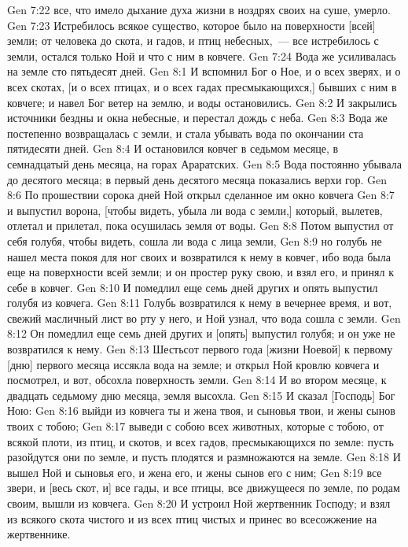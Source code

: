 \vs Gen 7:22 все, что имело дыхание духа жизни в ноздрях своих на суше, умерло.
\vs Gen 7:23 Истребилось всякое существо, которое было на поверхности [всей] земли; от человека до скота, и гадов, и птиц небесных,~--- все истребилось с земли, остался только Ной и что  с ним в ковчеге.
\vs Gen 7:24 Вода же усиливалась на земле сто пятьдесят дней.
\vs Gen 8:1 И вспомнил Бог о Ное, и о всех зверях, и о всех скотах, [и о всех птицах, и о всех гадах пресмыкающихся,] бывших с ним в ковчеге; и навел Бог ветер на землю, и воды остановились.
\vs Gen 8:2 И закрылись источники бездны и окна небесные, и перестал дождь с неба.
\vs Gen 8:3 Вода же постепенно возвращалась с земли, и стала убывать вода по окончании ста пятидесяти дней.
\vs Gen 8:4 И остановился ковчег в седьмом месяце, в семнадцатый день месяца, на горах Араратских.
\vs Gen 8:5 Вода постоянно убывала до десятого месяца; в первый день десятого месяца показались верхи гор.
\rsbpar\vs Gen 8:6 По прошествии сорока дней Ной открыл сделанное им окно ковчега
\vs Gen 8:7 и выпустил ворона, [чтобы видеть, убыла ли вода с земли,] который, вылетев, отлетал и прилетал, пока осушилась земля от воды.
\vs Gen 8:8 Потом выпустил от себя голубя, чтобы видеть, сошла ли вода с лица земли,
\vs Gen 8:9 но голубь не нашел места покоя для ног своих и возвратился к нему в ковчег, ибо вода была еще на поверхности всей земли; и он простер руку свою, и взял его, и принял к себе в ковчег.
\vs Gen 8:10 И помедлил еще семь дней других и опять выпустил голубя из ковчега.
\vs Gen 8:11 Голубь возвратился к нему в вечернее время, и вот, свежий масличный лист во рту у него, и Ной узнал, что вода сошла с земли.
\vs Gen 8:12 Он помедлил еще семь дней других и [опять] выпустил голубя; и он уже не возвратился к нему.
\rsbpar\vs Gen 8:13 Шестьсот первого года [жизни Ноевой] к первому [дню] первого месяца иссякла вода на земле; и открыл Ной кровлю ковчега и посмотрел, и вот, обсохла поверхность земли.
\vs Gen 8:14 И во втором месяце, к двадцать седьмому дню месяца, земля высохла.
\rsbpar\vs Gen 8:15 И сказал [Господь] Бог Ною:
\vs Gen 8:16 выйди из ковчега ты и жена твоя, и сыновья твои, и жены сынов твоих с тобою;
\vs Gen 8:17 выведи с собою всех животных, которые с тобою, от всякой плоти, из птиц, и скотов, и всех гадов, пресмыкающихся по земле: пусть разойдутся они по земле, и пусть плодятся и размножаются на земле.
\vs Gen 8:18 И вышел Ной и сыновья его, и жена его, и жены сынов его с ним;
\vs Gen 8:19 все звери, и [весь скот, и] все гады, и все птицы, все движущееся по земле, по родам своим, вышли из ковчега.
\rsbpar\vs Gen 8:20 И устроил Ной жертвенник Господу; и взял из всякого скота чистого и из всех птиц чистых и принес во всесожжение на жертвеннике.
